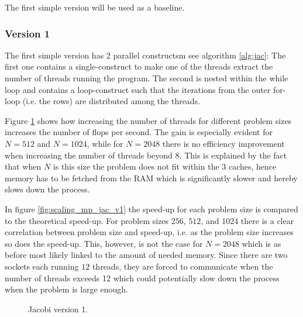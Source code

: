 The first simple version will be used as a baseline.

\subsubsection{Version 1}

The first simple version has 2 parallel constructsm see algorithm \ref{alg:jac}: The first one contains a single-construct to make one of the threads extract the number of threads running the program. The second is nested within the while loop and contains a loop-construct such that the iterations from the outer for-loop (i.e. the rows) are distributed among the threads.

Figure \ref{fig:jac_comp_measure_v1} shows how increasing the number of threads for different problem sizes increases the number of flops per second. The gain is especially evident for $N = 512$ and $N = 1024$, while for $N = 2048$ there is no efficiency improvement when increasing the number of threads beyond $8$. This is explained by the fact that when $N$ is this size the problem does not fit within the 3 caches, hence
memory has to be fetched from the RAM which is significantly slower and hereby slows down the process.

In figure \ref{fig:scaling_mp_jac_v1} the speed-up for each problem size is compared to the theoretical speed-up. For problem sizes $256$, $512$, and $1024$ there is a clear correlation between problem size and speed-up, i.e. as the problem size increases so does the speed-up. This, however, is not the case for $N=2048$ which is as before most likely linked to the amount of needed memory. Since there are two sockets each running $12$ threads, they are forced to communicate when the number of threads exceeds 12 which could potentially slow down the process when the problem is large enough. 


\begin{figure}[H]
\centering
{}
\caption{Jacobi version 1.}
\label{fig:jac_comp_measure_v1}
\end{figure}

